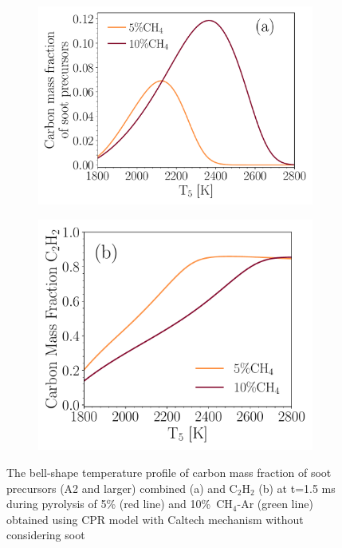 \begin{figure}[H]
	\centering
	\begin{subfigure}[t]{0.4\textwidth}
		\includegraphics[width=1\textwidth]{Figures/Results/Shocktube/Agafonov2016_cpr/SPC_cmf.pdf}
	\end{subfigure}
	\begin{subfigure}[t]{0.36\textwidth}
		\includegraphics[width=1\textwidth]{Figures/Results/Shocktube/Agafonov2016_cpr/C2H2_cmf.pdf}
	\end{subfigure}
	\caption{The bell-shape temperature profile of carbon mass fraction of soot precursors (A2 and larger) combined (a) and $\mathrm{C_2H_2}$ (b) at t=1.5 ms during pyrolysis of 5\% (red line) and 10\%~$\mathrm{CH_4}$-Ar (green line) obtained using CPR model with Caltech mechanism without considering soot}
	\label{fig:SPC_cmf_cpr} 
\end{figure}

